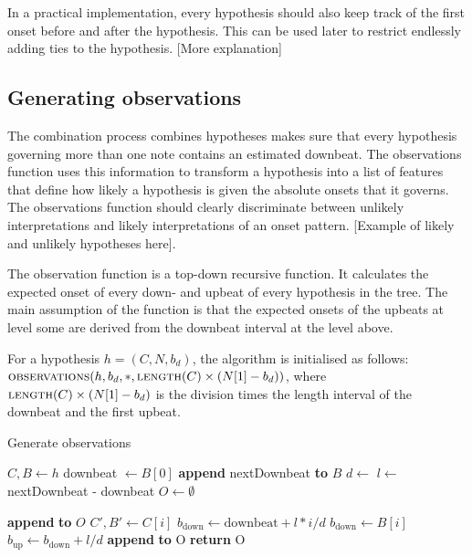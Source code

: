 In a practical implementation, every hypothesis should also keep track of the first onset before and after the hypothesis. This can be used later to restrict endlessly adding ties to the hypothesis. [More explanation]

\subsection{Generating observations}
\label{sec:observations}

The combination process combines hypotheses makes sure that every hypothesis governing more than one note contains an estimated downbeat. The observations function uses this information to transform a hypothesis into a list of features that define how likely a hypothesis is given the absolute onsets that it governs. The observations function should clearly discriminate between unlikely interpretations and likely interpretations of an onset pattern. [Example of likely and unlikely hypotheses here].

The observation function is a top-down recursive function. It calculates the expected onset of every down- and upbeat of every hypothesis in the tree. The main assumption of the function is that the expected onsets of the upbeats at level some are derived from the downbeat interval at the level above. 

For a hypothesis $h = (C, N, b_d)$, the algorithm is initialised as follows: $\textsc{observations}(h, b_d, *, \textsc{length}(C) \times (N[1] - b_d))$, where $\textsc{length}(C) \times (N[1] - b_d)$ is the division times the length interval of the downbeat and the first upbeat.
\begin{algorithm}
\caption{Generate observations}
\label{alg:observations}
\begin{algorithmic}
	\State $C, B \leftarrow h$
		\State downbeat $\leftarrow B[0]$
	\EndIf
	\State \textbf{append} nextDownbeat \textbf{to} $B$
	\State $d \leftarrow$ 
	\State $l \leftarrow$ nextDownbeat - downbeat
	\State $O \leftarrow \emptyset$

			\State \textbf{append}  \textbf{to} $O$
		\EndIf	
		\State $C', B' \leftarrow C[i]$
			\State $b_{\mathrm{down}} \leftarrow \mathrm{downbeat} + l * i/d$
				\State $b_{\mathrm{down}} \leftarrow B[i]$
			\EndIf
			\State $b_{\mathrm{up}} \leftarrow b_{\mathrm{down}} + l/d$
			\State \textbf{append}  \textbf{to} O
		\EndIf
	\EndFor
	\State \textbf{return} O
\EndFunction
\end{algorithmic}
\end{algorithm}

